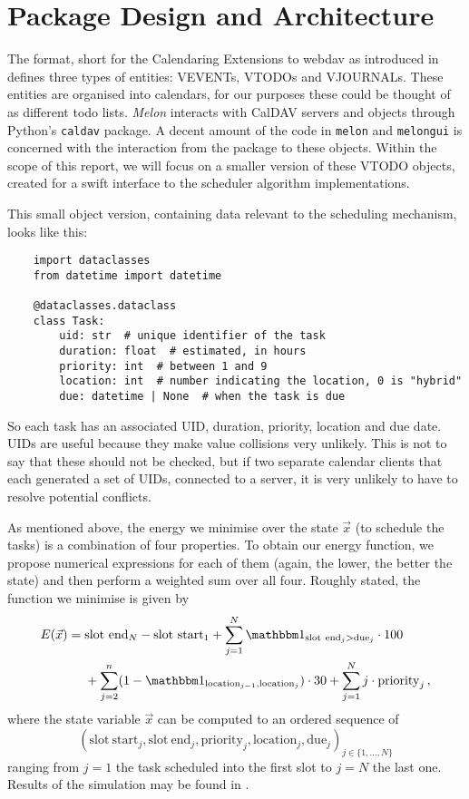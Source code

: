 \section{Package Design and Architecture}
The  format, short for the Calendaring Extensions to \gls{webdav} as introduced in \cite{caldav-rfc} defines three types of entities: VEVENTs, VTODOs and VJOURNALs.
These entities are organised into calendars, for our purposes these could be thought of as different todo lists.
\textit{Melon} interacts with CalDAV servers and objects through Python's \texttt{caldav} package.
A decent amount of the code in \texttt{melon} and \texttt{melongui} is concerned with the interaction from the package to these objects.
Within the scope of this report, we will focus on a smaller version of these VTODO objects, created for a swift interface to the scheduler algorithm implementations.

This small object version, containing data relevant to the scheduling mechanism, looks like this:
\begin{verbatim}
    import dataclasses
    from datetime import datetime

    @dataclasses.dataclass
    class Task:
        uid: str  # unique identifier of the task
        duration: float  # estimated, in hours
        priority: int  # between 1 and 9
        location: int  # number indicating the location, 0 is "hybrid"
        due: datetime | None  # when the task is due
  \end{verbatim}

So each task has an associated UID, duration, priority, location and due date.
UIDs are useful because they make value collisions very unlikely.
This is not to say that these should not be checked, but if two separate calendar clients that each generated a set of UIDs, connected to a server, it is very unlikely to have to resolve potential conflicts.

As mentioned above, the energy we minimise over the state $\vec{x}$ (to schedule the tasks) is a combination of four properties.
To obtain our energy function, we propose numerical expressions for each of them (again, the lower, the better the state) and then perform a weighted sum over all four.
Roughly stated, the function we minimise is given by
\begin{align}
  \label{eq:energy} E(\vec{x}) = \; & \mathrm{slot~end}_N - \mathrm{slot~start}_1 + \sum_{j=1}^{N} \identity_{\mathrm{slot~end}_j > \mathrm{due}_j} \cdot 100                    \\
  \nonumber                         & + \sum_{j=2}^{n} (1 - \identity_{\mathrm{location}_{j-1}, \mathrm{location}_{j}}) \cdot 30 + \sum_{j=1}^{N} j \cdot \mathrm{priority}_j\,,
\end{align}
where the state variable $\vec{x}$ can be computed to an ordered sequence of $$(\mathrm{slot~start}_j, \mathrm{slot~end}_j, \mathrm{priority}_j, \mathrm{location}_j, \mathrm{due}_j)_{j \in \{1, ..., N\}}$$ ranging from $j = 1$ the task scheduled into the first slot to $j = N$ the last one.
Results of the simulation may be found in .

